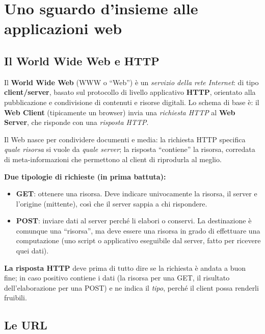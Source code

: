 \chapter{Uno sguardo d'insieme alle applicazioni web}

\section{Il World Wide Web e HTTP}

\begin{definizione}
Il \textbf{World Wide Web} (WWW o ``Web'') \`e un \emph{servizio della rete Internet}:
di tipo \textbf{client/server}, basato sul protocollo di livello applicativo \textbf{HTTP},
orientato alla pubblicazione e condivisione di contenuti e risorse digitali.
Lo schema di base \`e: il \textbf{Web Client} (tipicamente un browser) invia una
\emph{richiesta HTTP} al \textbf{Web Server}, che risponde con una \emph{risposta HTTP}.
\end{definizione}

Il Web nasce per condividere documenti e media: la richiesta HTTP specifica \emph{quale
risorsa} si vuole da \emph{quale server}; la risposta ``contiene'' la risorsa, corredata
di meta-informazioni che permettono al client di riprodurla al meglio.

\textbf{Due tipologie di richieste (in prima battuta):}
\begin{itemize}
  \item \textbf{GET}: ottenere una risorsa. Deve indicare univocamente la risorsa, il server
        e l'origine (mittente), cos\`i che il server sappia a chi rispondere.
  \item \textbf{POST}: inviare dati al server perch\'e li elabori o conservi. La destinazione
        \`e comunque una ``risorsa'', ma deve essere una risorsa in grado di effettuare una
        computazione (uno script o applicativo eseguibile dal server, fatto per ricevere quei dati).
\end{itemize}

\textbf{La risposta HTTP} deve prima di tutto dire se la richiesta \`e andata a buon fine;
in caso positivo contiene i dati (la risorsa per una GET, il risultato dell'elaborazione per
una POST) e ne indica il \emph{tipo}, perch\'e il client possa renderli fruibili.

\section{Le URL}

